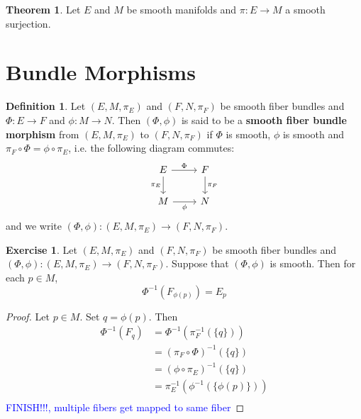 \documentclass{book}
\theoremstyle{definition}
\newtheorem{defn}[definition]{Definition}
\newtheorem{thm}[definition]{Theorem}
\newtheorem{ex}[definition]{Exercise}
\DeclareMathOperator*{\0}{\mbf{0}}
\DeclareMathOperator*{\1}{\mbf{1}}
\newcommand{\tbf}[1]{\textbf{#1}}
\newcommand{\tcb}[1]{\textcolor{blue}{#1}}
\begin{document}
\begin{thm}
	Let $E$ and $M$ be smooth manifolds and $\pi: E \rightarrow M$ a smooth surjection.
\end{thm}
	
	
	
	
	
	
	
	
	
	
	
	
	
	
	
	
	
	
	
	
	
	
	
	\newpage
	\section{Bundle Morphisms}
	
	\begin{defn}
		Let $(E, M, \pi_E)$ and $(F, N, \pi_F)$ be smooth fiber bundles and $\Phi: E \rightarrow F$ and $\phi: M \rightarrow N$. Then $(\Phi, \phi)$ is said to be a \tbf{smooth fiber bundle morphism} from $(E, M, \pi_E)$ to $(F, N, \pi_F)$ if $\Phi$ is smooth, $\phi$ is smooth and $\pi_F \circ \Phi = \phi \circ \pi_E$, 
		i.e. the following diagram commutes:
		\[ 
		\begin{tikzcd}
			E \arrow[r, "\Phi"] \arrow[d, "\pi_E"'] & F  \arrow[d, "\pi_F"] \\
			M \arrow[r, "\phi"']                  & N
		\end{tikzcd}
		\] 
		and we write $(\Phi, \phi): (E, M, \pi_E) \rightarrow (F, N, \pi_F)$.
	\end{defn}
	
	\begin{ex}
		Let $(E, M, \pi_E)$ and $(F, N, \pi_F)$ be smooth fiber bundles and $(\Phi, \phi): (E, M, \pi_E) \rightarrow (F, N, \pi_F)$. Suppose that $(\Phi, \phi)$ is smooth. Then for each $p \in M$, 
		$$\Phi^{-1}(F_{\phi(p)}) = E_{p}$$
	\end{ex}

	\begin{proof}
		Let $p \in M$. Set $q = \phi(p)$. Then 
		\begin{align*}
			\Phi^{-1}(F_{q})
			& = \Phi^{-1}(\pi_F^{-1}(\{q\})) \\
			& = (\pi_F \circ \Phi)^{-1}(\{q\}) \\
			& = (\phi \circ \pi_E)^{-1} (\{q\}) \\
			& = \pi_E^{-1} ( \phi^{-1}( \{\phi(p)\})) \\
		\end{align*}
	\tcb{FINISH!!!, multiple fibers get mapped to same fiber}
	\end{proof}
	
\end{document}
